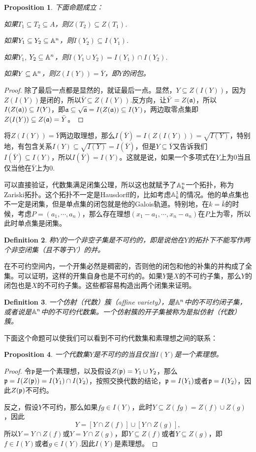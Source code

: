 \documentclass[9pt]{extbook}
\theoremstyle{plain}%
\newtheorem{defi}{Definition}[section]%
\newtheorem{pro}[defi]{Proposition}%
\begin{document}
\begin{pro}
下面命题成立：

 如果$T_1\subseteq T_2 \subseteq A$，则$Z(T_2)\subseteq Z(T_1)$.

 如果$Y_1\subseteq Y_2 \subseteq \mathbb{A}^n$，则$I(Y_2)\subseteq I(Y_1)$.

 如果$Y_1$, $Y_2 \subseteq \mathbb{A}^n$，则$I(Y_1\cup Y_2)=I(Y_1)\cap I(Y_2)$.

 如果$Y \subseteq \mathbb{A}^n$，则$Z(I(Y))=\bar{Y}$，即$Y$的闭包。
\end{pro}
\begin{proof}
除了最后一点都是显然的，就证最后一点。显然，$Y\subseteq Z(I(Y))$，因为$Z(I(Y))$是闭的，所以$\bar{Y}\subseteq Z(I(Y))$.反方向，让$\bar{Y}=Z(\mathfrak{a})$，所以$I(Z(\mathfrak{a}))\subseteq I(Y)$，即$\mathfrak{a}\subseteq \sqrt{\mathfrak{a}}=I(Z(\mathfrak{a}))\subseteq I(Y)$，两边取零点集即$Z(I(Y))\subseteq Z(\mathfrak{a})=\bar{Y}$。
\end{proof}
将$Z(I(Y))=\bar{Y}$两边取理想，那么$I(\bar{Y})=I(Z(I(Y)))=\sqrt{I(Y)}$，特别地，有包含关系$I(Y)\subseteq\sqrt{I(Y)}=I(\bar{Y})$，但是$Y\subseteq \bar{Y}$又告诉我们$I(\bar{Y})\subseteq I(Y)$，所以$I(\bar{Y})=I(Y)$。这就是说，如果一个多项式在$Y$上为$0$当且仅当他在$\bar{Y}$上为$0$.

可以直接验证，代数集满足闭集公理，所以这也就赋予了$\mathbb{A}^n_k$一个拓扑，称为Zariski拓扑。这个拓扑不一定是Hausdorff的，比如考虑$\mathbb{A}^1_k$的情况。他的单点集也不一定是闭集，但是单点集的闭包就是他的Galois轨道。特别地，在$k=\bar{k}$的时候，考虑$P=(a_1,\cdots ,a_n)$，那么存在理想$(x_1-a_1,\cdots,x_n-a_n)$在$P$上为零，所以此时单点集是闭集。

\begin{defi}
称$Y$的一个非空子集是不可约的，即是说他在$Y$的拓扑下不能写作两个非空闭集（且不等于$Y$）的并。
\end{defi}
在不可约空间内，一个开集必然是稠密的，否则他的闭包和他的补集的并构成了全集。可以证明，这样的开集自身也是不可约的。如果$Y$是$X$的不可约子集，那么$Y$的闭包也是$X$的不可约子集。这些都容易构造出两个闭集来证明。
 
\begin{defi}
一个仿射（代数）簇（affine variety），是$\mathbb{A}^n$中的不可约闭子集，或者说是$\mathbb{A}^n$中的不可约代数集。一个仿射簇的开子集被称为是拟仿射（代数）簇。
\end{defi}

下面这个命题可以使我们可以看到不可约代数集和素理想之间的联系：

\begin{pro}
一个代数集$Y$是不可约的当且仅当$I(Y)$是一个素理想。
\label{p1.2}
\end{pro}
\begin{proof}
令$\mathfrak{p}$是一个素理想，以及假设$Z(\mathfrak{p})=Y_1\cup Y_2$，那么$\mathfrak{p}=I(Z(\mathfrak{p}))=I(Y_1)\cap I(Y_2)$，按照交换代数的结论，$\mathfrak{p}=I(Y_1)$或者$\mathfrak{p}=I(Y_2)$，因此$Z(\mathfrak{p})$不可约。

反之，假设$Y$不可约，那么如果$fg\in I(Y)$，此时$Y\subseteq Z(fg)=Z(f)\cup Z(g)$，因此
\[
	Y=[Y\cap Z(f)]\cup [Y\cap Z(g)],
\]
所以$Y=Y\cap Z(f)$或$Y=Y\cap Z(g)$，即$Y\subseteq Z(f)$或者$Y\subseteq Z(g)$，即$f\in I(Y)$或者$g\in I(Y)$.因此$I(Y)$是素理想。
\end{proof}
\end{document}
